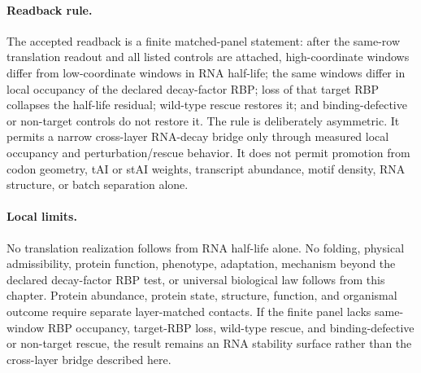 \paragraph{Readback rule.}
The accepted readback is a finite matched-panel statement: after the same-row translation readout and all listed controls are attached, high-coordinate windows differ from low-coordinate windows in RNA half-life; the same windows differ in local occupancy of the declared decay-factor RBP; loss of that target RBP collapses the half-life residual; wild-type rescue restores it; and binding-defective or non-target controls do not restore it.  The rule is deliberately asymmetric.  It permits a narrow cross-layer RNA-decay bridge only through measured local occupancy and perturbation/rescue behavior.  It does not permit promotion from codon geometry, tAI or stAI weights, transcript abundance, motif density, RNA structure, or batch separation alone.

\paragraph{Local limits.}
No translation realization follows from RNA half-life alone.  No folding, physical admissibility, protein function, phenotype, adaptation, mechanism beyond the declared decay-factor RBP test, or universal biological law follows from this chapter.  Protein abundance, protein state, structure, function, and organismal outcome require separate layer-matched contacts.  If the finite panel lacks same-window RBP occupancy, target-RBP loss, wild-type rescue, and binding-defective or non-target rescue, the result remains an RNA stability surface rather than the cross-layer bridge described here.
